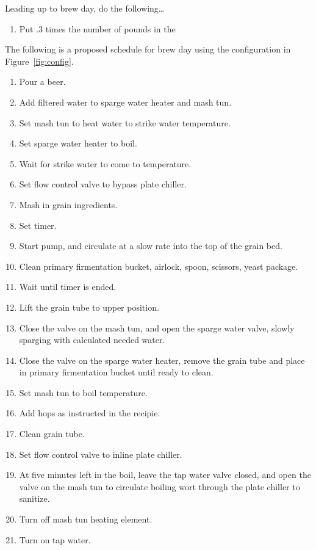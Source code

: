 Leading up to brew day, do the following\ldots
\begin{enumerate}
    \item Put .3 times the number of pounds in the 
\end{enumerate}
The following is a proposed schedule for brew day using the configuration in Figure~\ref{fig:config}.

\begin{enumerate}
    \item Pour a beer.
    \item Add filtered water to sparge water heater and mash tun.
    \item Set mash tun to heat water to strike water temperature.
    \item Set sparge water heater to boil.
    \item Wait for strike water to come to temperature.
    \item Set flow control valve to bypass plate chiller.
    \item Mash in grain ingredients.
    \item Set timer.
    \item Start pump, and circulate at a slow rate into the top of the grain bed.
    \item Clean primary firmentation bucket, airlock, spoon, scissors, yeast package.
    \item Wait until timer is ended.
    \item Lift the grain tube to upper position.
    \item Close the valve on the mash tun, and open the sparge water valve, slowly sparging with  calculated needed water.
    \item Close the valve on the sparge water heater, remove the grain tube and place in primary firmentation bucket until ready to clean.
    \item Set mash tun to boil temperature.
    \item Add hops as instructed in the recipie.
    \item Clean grain tube.
    \item Set flow control valve to inline plate chiller.
    \item At five minutes left in the boil, leave the tap water valve closed, and open the valve on the mash tun to circulate boiling wort through the plate chiller to sanitize.
    \item Turn off mash tun heating element.
    \item Turn on tap water.

\end{enumerate}
